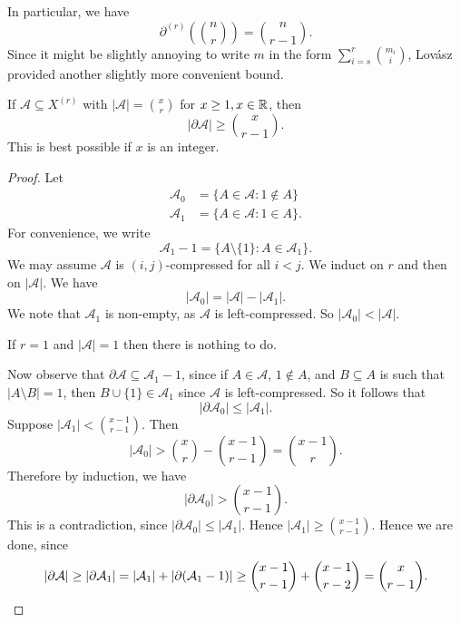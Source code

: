 \documentclass[a4paper]{article}
\begin{document}
In particular, we have
\[
  \partial^{(r)}\left(\binom{n}{r}\right) = \binom{n}{r - 1}.
\]
Since it might be slightly annoying to write $m$ in the form $\sum_{i = s}^r \binom{m_i}{i}$, Lov\'asz provided another slightly more convenient bound.
\begin{thm}
  If $\mathcal{A} \subseteq X^{(r)}$ with $|\mathcal{A}| = \binom{x}{r}$ for $x \geq 1, x \in \mathbb{R}$, then
  \[
    |\partial \mathcal{A}| \geq \binom{x}{r - 1}.
  \]
  This is best possible if $x$ is an integer.
\end{thm}

\begin{proof}
  Let
  \begin{align*}
    \mathcal{A}_0 &= \{A \in \mathcal{A}: 1 \not \in A\}\\
    \mathcal{A}_1 &= \{A \in \mathcal{A}: 1 \in A\}.
  \end{align*}
  For convenience, we write
  \[
    \mathcal{A}_1 - 1 = \{A \setminus \{1\}: A \in \mathcal{A}_1\}.
  \]
  We may assume $\mathcal{A}$ is $(i, j)$-compressed for all $i < j$. We induct on $r$ and then on $|\mathcal{A}|$. We have
  \[
    |\mathcal{A}_0| = |\mathcal{A}| - |\mathcal{A}_1|.
  \]
  We note that $\mathcal{A}_1$ is non-empty, as $\mathcal{A}$ is left-compressed. So $|\mathcal{A}_0| < |\mathcal{A}|$.

  If $r = 1$ and $|\mathcal{A}| = 1$ then there is nothing to do.

  Now observe that $\partial \mathcal{A} \subseteq \mathcal{A}_1 - 1$, since if $A \in \mathcal{A}$, $1 \not \in A$, and $B \subseteq A$ is such that $|A \setminus B| = 1$, then $B \cup \{1\} \in \mathcal{A}_1$ since $\mathcal{A}$ is left-compressed. So it follows that
  \[
    |\partial \mathcal{A}_0| \leq |\mathcal{A}_1|.
  \]
  Suppose $|\mathcal{A}_1| < \binom{x - 1}{r - 1}$. Then
  \[
    |\mathcal{A}_0| > \binom{x}{r} - \binom{x - 1}{r - 1} = \binom{x - 1}{r}.
  \]
  Therefore by induction, we have
  \[
    |\partial \mathcal{A}_0| > \binom{x - 1}{r - 1}.
  \]
  This is a contradiction, since $|\partial \mathcal{A}_0| \leq |\mathcal{A}_1|$. Hence $|\mathcal{A}_1| \geq \binom{x - 1}{r - 1}$. Hence we are done, since
  \[
    |\partial \mathcal{A}| \geq |\partial \mathcal{A}_1| = |\mathcal{A}_1| + |\partial (\mathcal{A}_1 - 1)| \geq \binom{x - 1}{r - 1} + \binom{x - 1}{r - 2} = \binom{x}{r - 1}.\qedhere
  \]
\end{proof}

%
%
%
\end{document}
